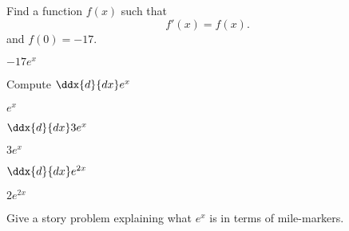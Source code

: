 \documentclass{ximera}
\begin{document}
\begin{question}
  Find a function $f(x)$ such that
  \[
  f'(x) = f(x).
  \]
  and $f(0) = -17$.
  \begin{answer}
    $-17e^x$
  \end{answer}
\end{question}

\begin{rotate} 
  \begin{question}
    Compute
    $\ddx{d}{dx} e^x$
    \begin{answer}
      $e^x$
    \end{answer}
  \end{question}
  \begin{question}
    $\ddx{d}{dx} 3e^x$
    \begin{answer}
      $3e^x$
    \end{answer}
  \end{question}
  \begin{question}
    $\ddx{d}{dx} e^{2x}$
    \begin{answer}
      $2e^{2x}$
    \end{answer}
  \end{question}
\end{rotate}


\begin{question}
  Give a story problem explaining what $e^x$ is in terms of
  mile-markers.
  \begin{answer}
  \end{answer}
\end{question}
\end{document}

